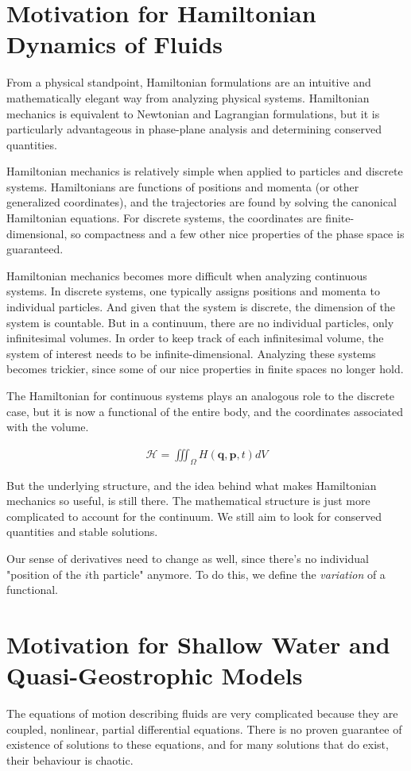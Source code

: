 \documentclass[12pt, twoside, letterpaper]{article}
\begin{document}
\section{Motivation for Hamiltonian Dynamics of Fluids}
From a physical standpoint, Hamiltonian formulations are an intuitive and mathematically elegant way from analyzing physical systems. Hamiltonian mechanics is equivalent to Newtonian and Lagrangian formulations, but it is particularly advantageous in phase-plane analysis and determining conserved quantities.

Hamiltonian mechanics is relatively simple when applied to particles and discrete systems. Hamiltonians are functions of positions and momenta (or other generalized coordinates), and the trajectories are found by solving the canonical Hamiltonian equations. For discrete systems, the coordinates are finite-dimensional, so compactness and a few other nice properties of the phase space is guaranteed.

Hamiltonian mechanics becomes more difficult when analyzing continuous systems. In discrete systems, one typically assigns positions and momenta to individual particles. And given that the system is discrete, the dimension of the system is countable. But in a continuum, there are no individual particles, only infinitesimal volumes. In order to keep track of each infinitesimal volume, the system of interest needs to be infinite-dimensional. Analyzing these systems becomes trickier, since some of our nice properties in finite spaces no longer hold.

The Hamiltonian for continuous systems plays an analogous role to the discrete case, but it is now a functional of the entire body, and the coordinates associated with the volume.

\begin{align}
\mathcal{H} = \iiint_\Omega H(\textbf{q}, \textbf{p}, t) dV
\end{align}

But the underlying structure, and the idea behind what makes Hamiltonian mechanics so useful, is still there. The mathematical structure is just more complicated to account for the continuum. We still aim to look for conserved quantities and stable solutions.

Our sense of derivatives need to change as well, since there's no individual "position of the $i$th particle" anymore. To do this, we define the \emph{variation} of a functional.

\section{Motivation for Shallow Water and Quasi-Geostrophic Models}
The equations of motion describing fluids are very complicated because they are coupled, nonlinear, partial differential equations. There is no proven guarantee of existence of solutions to these equations, and for many solutions that do exist, their behaviour is chaotic.
\end{document}
